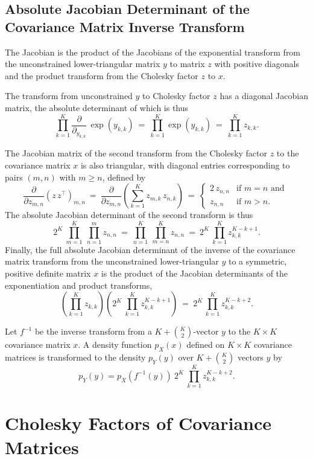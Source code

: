 \subsection{Absolute Jacobian Determinant of the Covariance
  Matrix Inverse Transform}

The Jacobian is the product of the Jacobians of the exponential
transform from the unconstrained lower-triangular matrix $y$ to matrix
$z$ with positive diagonals and the product transform from the
Cholesky factor $z$ to $x$.

The transform from unconstrained $y$ to Cholesky factor $z$ has a
diagonal Jacobian matrix, the absolute determinant of which is thus
%
\[
\prod_{k=1}^K  \frac{\partial}{\partial_{y_{k,k}}} \, \exp(y_{k,k})
\ = \
\prod_{k=1}^K \exp(y_{k,k})
\ = \
\prod_{k=1}^K z_{k,k}.
\]

The Jacobian matrix of the second transform from the Cholesky factor $z$ to
the covariance matrix $x$ is also triangular, with diagonal entries
corresponding to pairs $(m,n)$ with $m \geq n$, defined by
\[
\frac{\partial}{\partial z_{m,n}}
\left( z \, z^{\top} \right)_{m,n}
\ = \
\frac{\partial}{\partial z_{m,n}}
\left( \sum_{k=1}^K z_{m,k} \, z_{n,k} \right)
\ = \
\left\{
\begin{array}{cl}
2 \, z_{n,n} & \mbox{if } m = n \mbox{ and }
\\[4pt]
z_{n,n} & \mbox{if } m > n.
\end{array}
\right.
\]
%
The absolute Jacobian determinant of the second transform is thus
\[
2^{K} \ \prod_{m = 1}^{K} \ \prod_{n=1}^{m} z_{n,n}
\ = \
\prod_{n=1}^K \ \prod_{m=n}^K z_{n,n}
\ = \
2^{K} \ \prod_{k=1}^K z_{k,k}^{K - k + 1}.
\]
Finally, the full absolute Jacobian determinant of the inverse
of the covariance matrix transform from the unconstrained lower-triangular
$y$ to a symmetric, positive definite matrix $x$ is the product of the
Jacobian determinants of the exponentiation and product transforms,
\[
\left( \prod_{k=1}^K z_{k,k} \right)
\left(
2^{K} \ \prod_{k=1}^K z_{k,k}^{K - k + 1}
\right)
\ = \
2^K
\, \prod_{k=1}^K z_{k,k}^{K-k+2}.
\]

Let $f^{-1}$ be the inverse transform from a $K + \binom{K}{2}$-vector
$y$ to the $K \times K$ covariance matrix $x$.  A density function
$p_X(x)$ defined on $K \times K$ covariance matrices is transformed to
the density $p_Y(y)$ over $K + \binom{K}{2}$ vectors $y$ by
\[
p_Y(y) = p_X(f^{-1}(y)) \ 2^K \ \prod_{k=1}^K z_{k,k}^{K-k+2}.
\]

\section{Cholesky Factors of Covariance Matrices}

